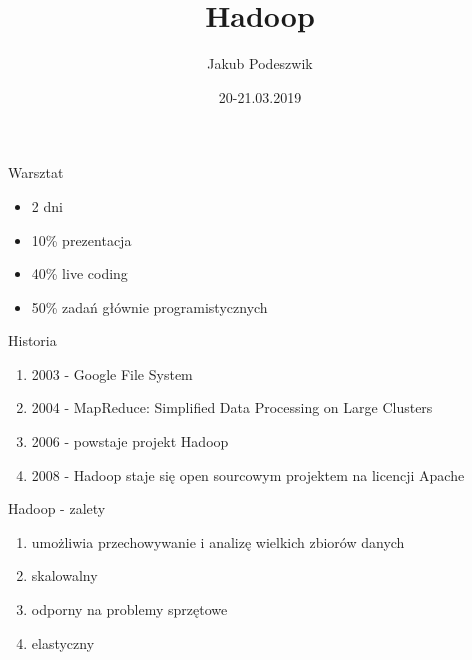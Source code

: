\documentclass{beamer}
\title[Hadoop]{Hadoop}
\author{Jakub Podeszwik}
\institute{infoShare Academy}
\date{20-21.03.2019}
\begin{document}
\begin{frame}
  \titlepage
\end{frame}

\begin{frame}{Warsztat}
	\begin{itemize}
		\item 2 dni
		\item 10\% prezentacja
		\item 40\% live coding
		\item 50\% zadań głównie programistycznych
	\end{itemize}
\end{frame}

\begin{frame}{Historia}
	\begin{enumerate}
		\item 2003 - Google File System
		\item 2004 - MapReduce: Simplified Data Processing on Large Clusters
		\item 2006 - powstaje projekt Hadoop
		\item 2008 - Hadoop staje się open sourcowym projektem na licencji Apache
	\end{enumerate}
\end{frame}

\begin{frame}{Hadoop - zalety}
	\begin{enumerate}
		\item umożliwia przechowywanie i analizę wielkich zbiorów danych
		\item skalowalny
		\item odporny na problemy sprzętowe
		\item elastyczny
	\end{enumerate}
\end{frame}
\end{document}
